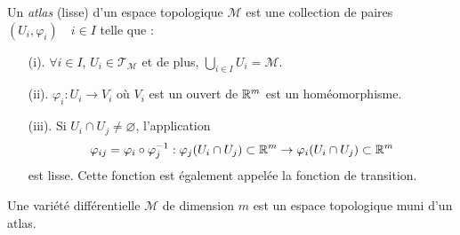 \begin{theoremframe}
    \begin{defi}
        Un \textit{atlas} (lisse) d'un espace topologique $\mathcal{M}$ est une collection de paires $(U_i,\varphi_i) \quad {i\in I}$ telle que :
        \begin{itemize}
            \item[(i).] $\forall i\in I$, $U_i \in \mathcal{T}_\mathcal{M}$ et de plus, $\bigcup_{i\in I} U_i = \mathcal{M}$.
            \item[(ii).] $\varphi_i:U_i\to V_i$ où $V_i$ est un ouvert de $\mathbb{R}^m$ est un homéomorphisme.
            \item[(iii).] Si $U_i \cap U_j \neq \varnothing$, l'application 
            \begin{align}
            \varphi_{ij} = \varphi_i \circ \varphi^{-1}_j:\varphi_j(U_i\cap U_j) \subset \mathbb{R}^m \to \varphi_i(U_i\cap U_j) \subset \mathbb{R}^m 
            \end{align}
            est lisse. Cette fonction est également appelée la fonction de transition.
        \end{itemize}
    \end{defi}
\end{theoremframe}
\begin{theoremframe}
    \begin{defi}
        Une variété différentielle $\mathcal{M}$ de dimension $m$ est un espace topologique muni d'un atlas.
    \end{defi}
\end{theoremframe}

